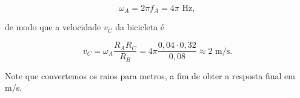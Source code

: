 \begin{exemplo}[Nível II]
$$ \omega_A = 2 \pi f_A = 4 \pi \text{ Hz},$$

\noindent de modo que a velocidade $v_C$ da bicicleta é

$$ v_C = \omega_A  \dfrac{R_A R_C}{R_B} = 4 \pi \dfrac{0,04 \cdot 0,32}{0,08}  \approx 2 \text{ m/s.} $$

Note que convertemos os raios para metros, a fim de obter a resposta final em m/s.

\end{exemplo}




